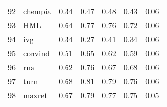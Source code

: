 \documentclass[12pt]{article}
\begin{document}
\begin{footnotesize}
\begin{longtable}{rl|c|c|c|c|c}
92  & chempia          & 0.34                                                                                      & 0.47                                                                                        & 0.48                                                                                         & 0.43 & 0.06               \\
93  & HML              & 0.64                                                                                      & 0.77                                                                                        & 0.76                                                                                         & 0.72 & 0.06               \\
94  & ivg              & 0.34                                                                                      & 0.27                                                                                        & 0.41                                                                                         & 0.34 & 0.06               \\
95  & convind          & 0.51                                                                                      & 0.65                                                                                        & 0.62                                                                                         & 0.59 & 0.06               \\
96  & rna              & 0.62                                                                                      & 0.76                                                                                        & 0.67                                                                                         & 0.68 & 0.06               \\
97  & turn             & 0.68                                                                                      & 0.81                                                                                        & 0.79                                                                                         & 0.76 & 0.06               \\
98  & maxret           & 0.67                                                                                      & 0.79                                                                                        & 0.77                                                                                         & 0.75 & 0.05               \\

\end{longtable}
\end{footnotesize}
\end{document}
